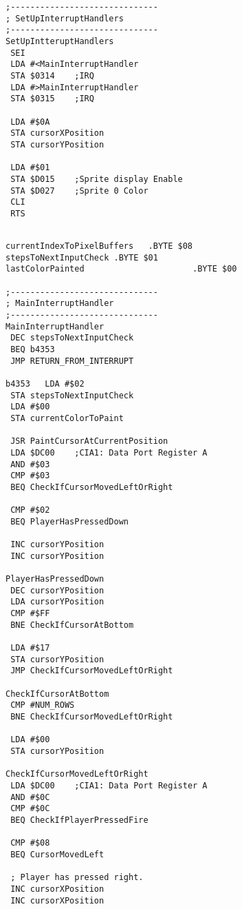\begin{minipage}[b]{0.33\linewidth}
\begin{lrbox}{\mybox}
\begin{lstlisting}[basicstyle=\ttfamily\tiny]
;------------------------------
; SetUpInterruptHandlers
;------------------------------
SetUpIntteruptHandlers   
 SEI 
 LDA #<MainInterruptHandler
 STA $0314    ;IRQ
 LDA #>MainInterruptHandler
 STA $0315    ;IRQ

 LDA #$0A
 STA cursorXPosition
 STA cursorYPosition

 LDA #$01
 STA $D015    ;Sprite display Enable
 STA $D027    ;Sprite 0 Color
 CLI 
 RTS 

\end{lstlisting}
\end{lrbox}%
\scalebox{0.8}{\usebox{\mybox}}
\end{minipage}
\hspace{-0.1cm}
\begin{minipage}[b]{0.33\linewidth}
\begin{lrbox}{\mybox}%
\begin{lstlisting}[basicstyle=\ttfamily\tiny]

currentIndexToPixelBuffers   .BYTE $08 
stepsToNextInputCheck .BYTE $01
lastColorPainted                      .BYTE $00

;------------------------------
; MainInterruptHandler
;------------------------------
MainInterruptHandler   
 DEC stepsToNextInputCheck
 BEQ b4353
 JMP RETURN_FROM_INTERRUPT

b4353   LDA #$02
 STA stepsToNextInputCheck
 LDA #$00
 STA currentColorToPaint

 JSR PaintCursorAtCurrentPosition
 LDA $DC00    ;CIA1: Data Port Register A
 AND #$03
 CMP #$03
 BEQ CheckIfCursorMovedLeftOrRight

 CMP #$02
 BEQ PlayerHasPressedDown

 INC cursorYPosition
 INC cursorYPosition

PlayerHasPressedDown   
 DEC cursorYPosition
 LDA cursorYPosition
 CMP #$FF
 BNE CheckIfCursorAtBottom

 LDA #$17
 STA cursorYPosition
 JMP CheckIfCursorMovedLeftOrRight

CheckIfCursorAtBottom   
 CMP #NUM_ROWS
 BNE CheckIfCursorMovedLeftOrRight

 LDA #$00
 STA cursorYPosition

CheckIfCursorMovedLeftOrRight   
 LDA $DC00    ;CIA1: Data Port Register A
 AND #$0C
 CMP #$0C
 BEQ CheckIfPlayerPressedFire

 CMP #$08
 BEQ CursorMovedLeft

 ; Player has pressed right.
 INC cursorXPosition
 INC cursorXPosition


\end{lstlisting}
\end{lrbox}
\end{minipage}
